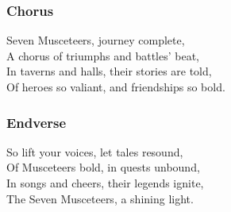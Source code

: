 \documentclass[letterpaper,openany,oneside,twocolumn]{book}
\begin{document}
\subsubsection*{Chorus}
\entryfont Seven Musceteers, journey complete,\\
A chorus of triumphs and battles' beat,\\
In taverns and halls, their stories are told,\\
Of heroes so valiant, and friendships so bold.

\subsubsection*{Endverse}
So lift your voices, let tales resound,\\
Of Musceteers bold, in quests unbound,\\
In songs and cheers, their legends ignite,\\
The Seven Musceteers, a shining light.
\vfill
\end{document}
